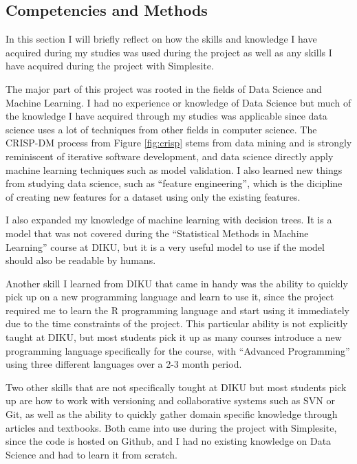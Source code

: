 \subsection{Competencies and Methods}

In this section I will briefly reflect on how the skills and knowledge I have
acquired during my studies was used during the project as well as any skills I
have acquired during the project with Simplesite.

The major part of this project was rooted in the fields of Data Science and
Machine Learning. I had no experience or knowledge of Data Science but much of
the knowledge I have acquired through my studies was applicable since data
science uses a lot of techniques from other fields in computer science. The
CRISP-DM process from Figure \ref{fig:crisp} stems from data mining and is
strongly reminiscent of iterative software development, and data science
directly apply machine learning techniques such as model validation. I also
learned new things from studying data science, such as ``feature engineering'',
which is the dicipline of creating new features for a dataset using only the
existing features.

I also expanded my knowledge of machine learning with decision trees. It is a
model that was not covered during the ``Statistical Methods in Machine
Learning'' course at DIKU, but it is a very useful model to use if the model
should also be readable by humans.

Another skill I learned from DIKU that came in handy was the ability to quickly
pick up on a new programming language and learn to use it, since the project
required me to learn the R programming language and start using it immediately
due to the time constraints of the project. This particular ability is not
explicitly taught at DIKU, but most students pick it up as many courses
introduce a new programming language specifically for the course, with
``Advanced Programming'' using three different languages over a 2-3 month
period.

Two other skills that are not specifically tought at DIKU but most students pick
up are how to work with versioning and collaborative systems such as SVN or Git,
as well as the ability to quickly gather domain specific knowledge through
articles and textbooks. Both came into use during the project with Simplesite,
since the code is hosted on Github, and I had no existing knowledge on Data
Science and had to learn it from scratch.


